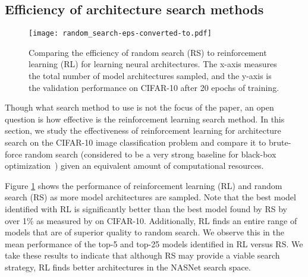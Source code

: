 \subsection{Efficiency of architecture search methods}
\label{sec:random_search}

\begin{figure}[h!]
\begin{center}
\texttt{[image: random\_search-eps-converted-to.pdf]}
\caption{Comparing the efficiency of random search (RS) to reinforcement learning (RL) for learning neural architectures. The x-axis measures the total number of model architectures sampled, and the y-axis is the validation performance on CIFAR-10 after 20 epochs of training. 
}
\label{figure:random-search}
\end{center}
\end{figure}

Though what search method to use is not the focus of the paper, an open question is how effective is the reinforcement learning search method. In this section, we study the effectiveness of reinforcement learning for architecture search on the CIFAR-10 image classification problem and compare it to brute-force random search (considered to be a very strong baseline for black-box optimization~\cite{bergstra2012random}) given an equivalent amount of computational resources. 



Figure \ref{figure:random-search} shows the performance of reinforcement learning (RL) and random search (RS) as more model architectures are sampled. Note that the best model identified with RL is significantly better than the best model found by RS by over 1\% as measured by on CIFAR-10. Additionally, RL finds an entire range of models that are of superior quality to random search. We observe this in the mean performance of the top-5 and top-25 models identified in RL versus RS.
We take these results to indicate that although RS may provide a viable search strategy, RL finds better architectures in the NASNet search space.


